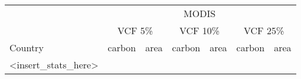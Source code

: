 \documentclass[10pt]{article}
\begin{document}
\begin{tabular}{lllllll}  %

\toprule

& \multicolumn{6}{c}{MODIS} \\
& \multicolumn{2}{c}{VCF 5\%} & \multicolumn{2}{c}{VCF 10\%} & \multicolumn{2}{c}{VCF 25\%} \\
\cmidrule(lr){2-6}
Country & carbon & area & carbon & area & carbon & area \\
\cmidrule{1-7}

<insert_stats_here>


\bottomrule
\end{tabular}
\end{document}
